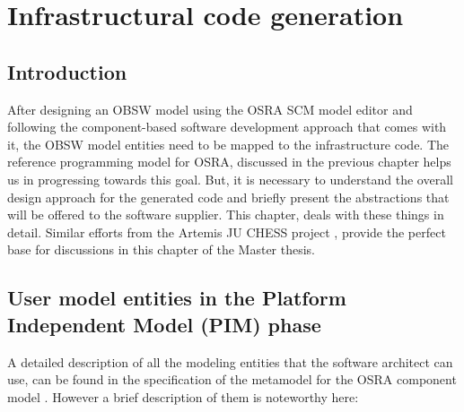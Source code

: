 
\chapter{Infrastructural code generation}
\label{chap: Code generation}
\section{Introduction}
After designing an OBSW model using the OSRA SCM model editor and following the component-based software development approach that comes with it, the OBSW model entities need to be mapped to the infrastructure code. The reference programming model for OSRA, discussed in the previous chapter helps us in progressing towards this goal. But, it is necessary to understand the overall design approach for the generated code and briefly present the abstractions that will be offered to the software supplier. This chapter, deals with these things in detail. Similar efforts from the Artemis JU CHESS project \cite{EvoRAVCodeAr}, provide the perfect base for discussions in this chapter of the Master thesis.   

\section{User model entities in the Platform Independent Model (PIM) phase}
A detailed description of all the modeling entities that the software architect can use, can be found in the specification of the metamodel for the OSRA component model \cite{SpecMetamodel}. However a brief description of them is noteworthy here:
 
